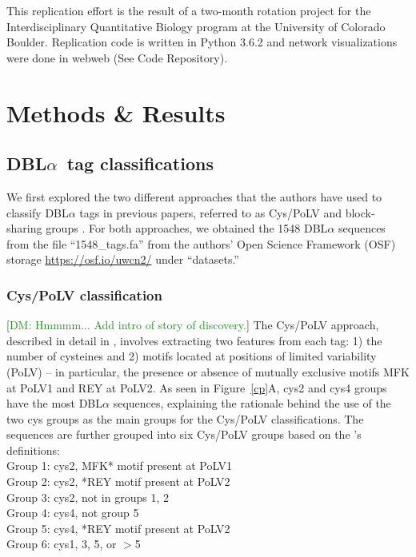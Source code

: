 \documentclass[10pt,twocolumn,superscriptaddress]{revtex4-1}
\newcommand{\dieumycom}[1]{[\textcolor{ForestGreen}{DM: #1}]}
\newcommand{\dbla}{{DBL$\alpha$}\xspace}
\newcommand{\cp}{{Cys/PoLV}\xspace}
\begin{document}
This replication effort is the result of a two-month rotation project for the Interdisciplinary Quantitative Biology program at the University of Colorado Boulder. Replication code is written in Python 3.6.2 and network visualizations were done in webweb (See Code Repository). 


\section{Methods \& Results}

\subsection{\dbla\ tag classifications}
We first explored the two different approaches that the authors have used to classify \dbla tags in previous papers, referred to as \cp \cite{bull2007} and block-sharing groups \cite{bull2008}. For both approaches, we obtained the 1548 \dbla sequences from the file ``1548\_tags.fa'' from the authors' Open Science Framework (OSF) storage \url{https://osf.io/uwcn2/} under ``datasets.''  

\subsubsection{\cp classification}

\dieumycom{Hmmmm... Add intro of story of discovery.} 
The \cp approach, described in detail in \cite{bull2007}, involves extracting two features from each tag: 1) the number of cysteines and 2) motifs located at positions of limited variability (PoLV) -- in particular, the presence or absence of mutually exclusive motifs MFK at PoLV1 and REY at PoLV2. As seen in Figure~\ref{cp}A, cys2 and cys4 groups have the most \dbla sequences, explaining the rationale behind the use of the two cys groups as the main groups for the \cp classifications. The sequences are further grouped into six \cp groups based on the \cite{bull2007}'s definitions:  \\

\noindent Group 1: cys2, MFK* motif present at PoLV1  \\
Group 2: cys2, *REY motif present at PoLV2   \\
Group 3: cys2, not in groups 1, 2   \\
Group 4: cys4, not group 5   \\
Group 5: cys4, *REY motif present at PoLV2  \\
Group 6: cys1, 3, 5, or $>$5  \\
\end{document}
